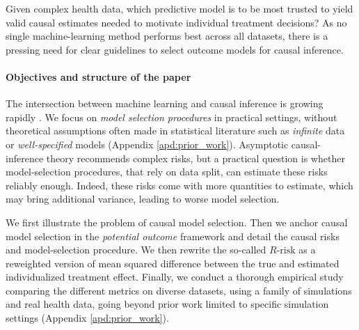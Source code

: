 \documentclass[a4paper,num-refs]{oup-contemporary}%
\begin{document}
Given complex health data, which predictive model is to be most trusted to yield
valid causal estimates needed to motivate individual treatment decisions?
As no single machine-learning method performs best across all datasets, there is a
pressing need for clear guidelines to select outcome models for causal
inference.


\paragraph{Objectives and structure of the paper}

The intersection between machine learning and causal inference is growing rapidly
\cite{kaddour2022causal,chernozhukov2024applied}. We focus on \textit{model selection procedures} in practical settings,
without theoretical assumptions often made in statistical literature such
as \textit{infinite} data or \textit{well-specified} models (Appendix
\ref{apd:prior_work}). Asymptotic causal-inference theory recommends complex
risks, but a practical question is whether model-selection procedures, that rely
on data split, can estimate these risks reliably enough. Indeed, these
risks come with
more quantities to estimate, which may bring additional variance, leading to
worse model selection.

We first illustrate the problem of causal model selection. Then we anchor causal model selection in the \emph{potential outcome}
framework and detail the causal risks and model-selection procedure. We then
rewrite the so-called $R\text{-risk}$ as a reweighted version of mean squared
difference between the true and estimated individualized treatment effect.
Finally, we conduct a thorough empirical study comparing the different metrics
on diverse datasets, using a family of simulations and real health
data, going beyond prior work limited to specific simulation settings
\cite{schuler_comparison_2018,alaa_validating_2019} (Appendix
\ref{apd:prior_work}).

\end{document}
